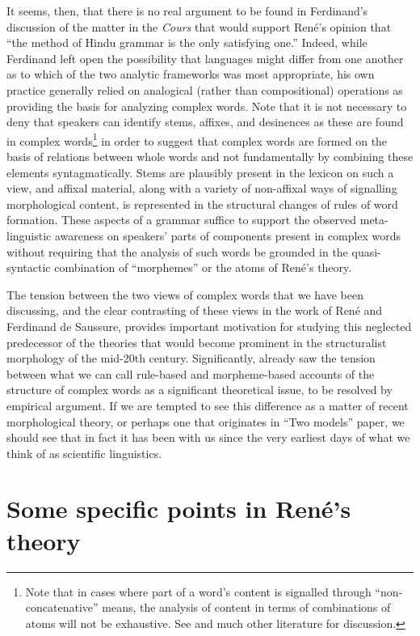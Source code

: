 \documentclass[output=paper]{langsci/langscibook}
\begin{document}
It seems, then, that there is no real argument to be found in
Ferdinand's discussion of the matter in the \textsl{Cours} that would
support Ren\'e's opinion that ``the method of Hindu grammar is the
only satisfying one.'' Indeed, while Ferdinand left open the
possibility that languages might differ from one another as to which
of the two analytic frameworks was most appropriate, his own practice
generally relied on analogical (rather than compositional) operations
as providing the basis for analyzing complex words. Note that it is
not necessary to deny that speakers can identify stems, affixes, and
desinences as these are found in complex words\footnote{Note that in
  cases where part of a word's content is signalled through
  ``non-concatenative'' means, the analysis of content in terms of
  combinations of atoms will not be exhaustive. See
  \citet{sra:morph_book} and much other literature for discussion.}
in order to suggest that complex words are formed on the basis of
relations between whole words and not fundamentally by combining these
elements syntagmatically.  Stems are plausibly present in the lexicon
on such a view, and affixal material, along with a variety of
non-affixal ways of signalling morphological content, is represented
in the structural changes of rules of word formation.  These aspects
of a grammar suffice to support the observed meta-linguistic awareness
on speakers' parts of components present in complex words without
requiring that the analysis of such words be grounded in the
quasi-syntactic combination of ``morphemes'' or the atoms of René's
theory.

The tension between the two views of complex words that we have been
discussing, and the clear contrasting of these views in the work of
Ren\'e and Ferdinand de Saussure, provides important motivation for
studying this neglected predecessor of the theories that would become
prominent in the structuralist morphology of the mid-20th
century. Significantly, \cite{saussure:cours} already saw the tension
between what we can call rule-based and morpheme-based accounts of the
structure of complex words as a significant theoretical issue, to be
resolved by empirical argument. If we are tempted to see this difference
as a matter of recent morphological theory, or perhaps one that
originates in  “Two models” paper, we
should see that in fact it has been with us since the very earliest
days of what we think of as scientific linguistics.

\section{Some specific points in René's theory}
\label{sec:specifics}
\end{document}
